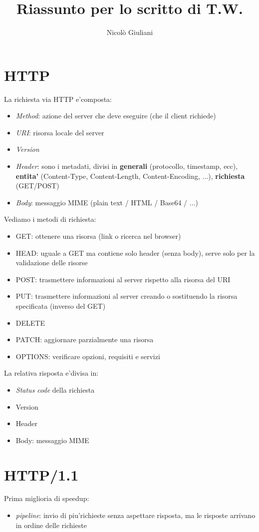 \documentclass[a4paper,12pt]{article}
\title{Riassunto per lo scritto di T.W.}
\author{Nicolò Giuliani}
\date{}
\begin{document}
\maketitle
\section{HTTP}
La richiesta via HTTP e'composta:
\begin{itemize}
    \item \textit{Method}: azione del server che deve eseguire (che il client richiede)
    \item \textit{URI}: risorsa locale del server
    \item \textit{Version}
    \item \textit{Header}: sono i metadati, divisi in \textbf{generali} (protocollo, timestamp, ecc), \textbf{entita'} (Content-Type, Content-Length, Content-Encoding, ...), \textbf{richiesta} (GET/POST)
    \item \textit{Body}: messaggio MIME (plain text / HTML / Base64 / ...)
\end{itemize}
Vediamo i metodi di richiesta:
\begin{itemize}
    \item GET: ottenere una risorsa (link o ricerca nel browser)
    \item HEAD: uguale a GET ma contiene solo header (senza body), serve solo per la validazione delle risorse
    \item POST: trasmettere informazioni al server rispetto alla risorsa del URI
    \item PUT: trasmettere informazioni al server creando o sostituendo la risorsa specificata (inverso del GET)
    \item DELETE
    \item PATCH: aggiornare parzialmente una risorsa
    \item OPTIONS: verificare opzioni, requisiti e servizi
\end{itemize}
La relativa risposta e'divisa in:
\begin{itemize}
    \item \textit{Status code} della richiesta
    \item Version
    \item Header
    \item Body: messaggio MIME
\end{itemize}
\section{HTTP/1.1}
Prima miglioria di speedup:
\begin{itemize}
    \item \textit{pipeline}: invio di piu'richieste senza aspettare risposta, ma le risposte arrivano in ordine delle richieste
\end{itemize}
\end{document}
